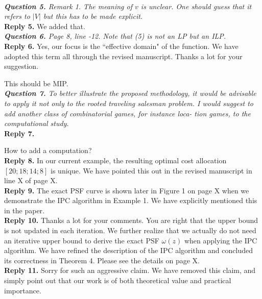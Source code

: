\documentclass[11pt]{article}
\begin{document}
\\[4mm]
%
%
%
\noindent \textit{\textbf{Question 5.}
Remark 1. The meaning of $v$ is unclear. One should guess that it refers
to $|V|$ but this has to be made explicit.
}
\\[2mm]
\noindent \textbf{Reply 5.}
We added that.
\\[4mm]
%
%
%
\noindent \textit{\textbf{Question 6.}
Page 8, line -12. Note that (5) is not an LP but an ILP.
}
\\[2mm]
\noindent \textbf{Reply 6.}
Yes, our focus is the ``effective domain" of the function.
We have adopted this term all through the revised manuscript.
Thanks a lot for your suggestion.

This should be MIP.
\\[4mm]
%
%
%
\noindent \textit{\textbf{Question 7.}
To better illustrate the proposed methodology, it would be advisable
to apply it not only to the rooted traveling salesman problem. I would
suggest to add another class of combinatorial games, for instance loca-
tion games, to the computational study.}
\\[2mm]
\noindent \textbf{Reply 7.}

How to add a computation?
\\[4mm]
%
%

\noindent \textbf{Reply 8.}
In our current example, the resulting optimal cost allocation $[20; 18; 14; 8]$ is unique.
We have pointed this out in the revised manuscript in line X of page X.
\\[4mm]
%
%
%
\noindent \textbf{Reply 9.}
The exact PSF curve is shown later in Figure 1 on page X when we demonstrate the IPC algorithm in Example 1. We have explicitly mentioned this in the paper.
\\[4mm]
%
%

\noindent \textbf{Reply 10.}
Thanks a lot for your comments.
You are right that the upper bound is not updated in each iteration. We further realize that we actually do not need an iterative upper bound to derive the exact PSF $\omega(z)$ when applying the IPC algorithm.
We have refined the description of the IPC algorithm and concluded its correctness in Theorem 4.
Please see the details on page X.
\\[4mm]
%
%

\noindent \textbf{Reply 11.}
Sorry for such an aggressive claim. We have removed this claim, and simply point out that our work is of both theoretical value and practical importance.
\\[4mm]



\end{document}
